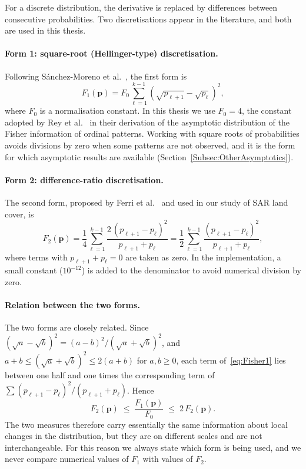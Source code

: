 For a discrete distribution, the derivative is replaced by differences between consecutive probabilities. Two discretisations appear in the literature, and both are used in this thesis.

\paragraph{Form 1: square-root (Hellinger-type) discretisation.} Following Sánchez-Moreno et al.~\cite{sanchez2009discrete}, the first form is
\begin{equation}
	F_1(\mathbf{p})=F_0\sum_{\ell=1}^{k-1}\left(\sqrt{p_{\ell+1}}-\sqrt{p_\ell}\right)^2,
	\label{eq:Fisher1}
\end{equation}
where $F_0$ is a normalisation constant. In this thesis we use $F_0=4$, the constant adopted by Rey et al.~\cite{Rey2024} in their derivation of the asymptotic distribution of the Fisher information of ordinal patterns. Working with square roots of probabilities avoids divisions by zero when some patterns are not observed, and it is the form for which asymptotic results are available (Section~\ref{Subsec:OtherAsymptotics}).

\paragraph{Form 2: difference-ratio discretisation.} The second form, proposed by Ferri et al.~\cite{Ferri2009} and used in our study of SAR land cover, is
\begin{equation}
	F_2(\mathbf{p})=\frac{1}{4}\sum_{\ell=1}^{k-1}\frac{2\,(p_{\ell+1}-p_\ell)^2}{p_{\ell+1}+p_\ell}
	=\frac{1}{2}\sum_{\ell=1}^{k-1}\frac{(p_{\ell+1}-p_\ell)^2}{p_{\ell+1}+p_\ell},
	\label{eq:Fisher2}
\end{equation}
where terms with $p_{\ell+1}+p_\ell=0$ are taken as zero. In the implementation, a small constant ($10^{-12}$) is added to the denominator to avoid numerical division by zero.

\paragraph{Relation between the two forms.} The two forms are closely related. Since $(\sqrt{a}-\sqrt{b})^2=(a-b)^2/(\sqrt{a}+\sqrt{b})^2$, and $a+b\leq(\sqrt{a}+\sqrt{b})^2\leq 2(a+b)$ for $a,b\geq 0$, each term of~\eqref{eq:Fisher1} lies between one half and one times the corresponding term of $\sum (p_{\ell+1}-p_\ell)^2/(p_{\ell+1}+p_\ell)$. Hence
\begin{equation}
	F_2(\mathbf{p})\;\leq\;\frac{F_1(\mathbf{p})}{F_0}\;\leq\;2\,F_2(\mathbf{p}).
	\label{eq:FisherBounds}
\end{equation}
The two measures therefore carry essentially the same information about local changes in the distribution, but they are on different scales and are not interchangeable. For this reason we always state which form is being used, and we never compare numerical values of $F_1$ with values of $F_2$.

